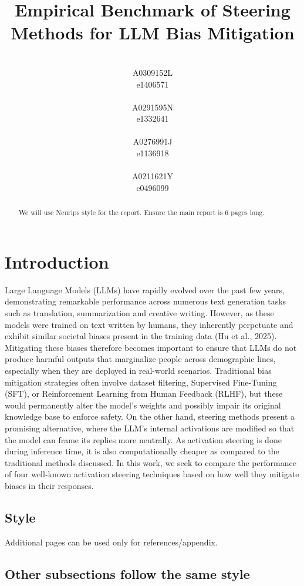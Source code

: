 \documentclass{article}
\title{Empirical Benchmark of Steering Methods for LLM Bias Mitigation}
\author{%
  \makebox[0.4\textwidth]{Chin Ling Xing, Lance*}\\
  A0309152L\\
  e1406571\\
  \And
  \makebox[0.4\textwidth]{Lim Yan Khai, Bennett*}\\
  A0291595N\\
  e1332641\\
  \AND
  \makebox[0.4\textwidth]{Pradyumna Shyama Prasad*}\\
  A0276991J\\
  e1136918\\
  \And
  \makebox[0.4\textwidth]{Ou Chuhao*}\\
  A0211621Y\\
  e0496099\\
}
\begin{document}
\maketitle
{\renewcommand\thefootnote{*}}


\begin{abstract}
 We will use Neurips style for the report. Ensure the main report is 6 pages long.
\end{abstract}



\section{Introduction}

Large Language Models (LLMs) have rapidly evolved over the past few years, demonstrating remarkable performance across numerous text generation tasks such as translation, summarization and creative writing. However, as these models were trained on text written by humans, they inherently perpetuate and exhibit similar societal biases present in the training data (Hu et al., 2025). Mitigating these biases therefore becomes important to ensure that LLMs do not produce harmful outputs that marginalize people across demographic lines, especially when they are deployed in real-world scenarios. Traditional bias mitigation strategies often involve dataset filtering, Supervised Fine-Tuning (SFT), or Reinforcement Learning from Human Feedback (RLHF), but these would permanently alter the model’s weights and possibly impair its original knowledge base to enforce safety. On the other hand, steering methods present a promising alternative, where the LLM’s internal activations are modified so that the model can frame its replies more neutrally. As activation steering is done during inference time, it is also computationally cheaper as compared to the traditional methods discussed. In this work, we seek to compare the performance of four well-known activation steering techniques based on how well they mitigate biases in their responses.


\subsection{Style}


Additional pages can be used only for references/appendix.



\subsection{Other subsections follow the same style}
\end{document}
